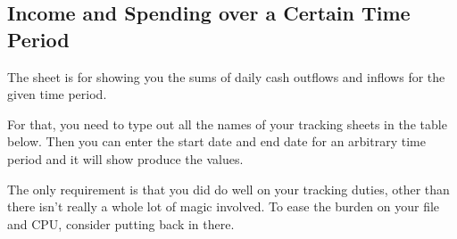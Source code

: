 \subsection{Income and Spending over a Certain Time Period}
\label{subsec:income-and-spending-certain-time-period}

The sheet  is for showing you the sums of daily cash outflows and inflows for the given time period.

For that, you need to type out all the names of your tracking sheets in the table below.
Then you can enter the start date and end date for an arbitrary time period and it will show produce the values.

The only requirement is that you did do well on your tracking duties, other than there isn't really a whole lot of magic involved.
To ease the burden on your file and CPU, consider putting  back in there.